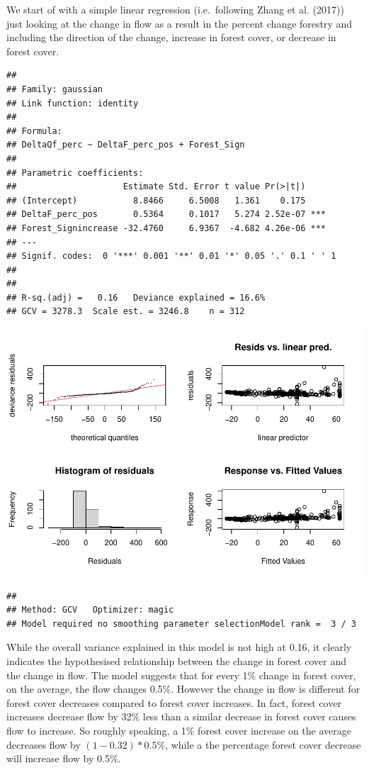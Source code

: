 \documentclass[]{elsarticle} %
\begin{document}
We start of with a simple linear regression (i.e.~following Zhang et al.
(2017)) just looking at the change in flow as a result in the percent
change forestry and including the direction of the change, increase in
forest cover, or decrease in forest cover.

\begin{verbatim}
## 
## Family: gaussian 
## Link function: identity 
## 
## Formula:
## DeltaQf_perc ~ DeltaF_perc_pos + Forest_Sign
## 
## Parametric coefficients:
##                     Estimate Std. Error t value Pr(>|t|)    
## (Intercept)           8.8466     6.5008   1.361    0.175    
## DeltaF_perc_pos       0.5364     0.1017   5.274 2.52e-07 ***
## Forest_Signincrease -32.4760     6.9367  -4.682 4.26e-06 ***
## ---
## Signif. codes:  0 '***' 0.001 '**' 0.01 '*' 0.05 '.' 0.1 ' ' 1
## 
## 
## R-sq.(adj) =   0.16   Deviance explained = 16.6%
## GCV = 3278.3  Scale est. = 3246.8    n = 312
\end{verbatim}

\includegraphics{Forest_and_Water_files/figure-latex/model1-1.pdf}

\begin{verbatim}
## 
## Method: GCV   Optimizer: magic
## Model required no smoothing parameter selectionModel rank =  3 / 3
\end{verbatim}

While the overall variance explained in this model is not high at 0.16,
it clearly indicates the hypothesised relationship between the change in
forest cover and the change in flow. The model suggests that for every
1\% change in forest cover, on the average, the flow changes 0.5\%.
However the change in flow is different for forest cover decreases
compared to forest cover increases. In fact, forest cover increases
decrease flow by 32\% less than a similar decrease in forest cover
causes flow to increase. So roughly speaking, a 1\% forest cover
increase on the average decreases flow by \((1 - 0.32)*0.5\%\), while a
the percentage forest cover decrease will increase flow by 0.5\%.
\end{document}
